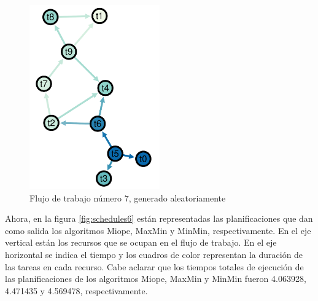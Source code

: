 \begin{figure}
\begin{center}
  \includegraphics[width=0.5\textwidth]{imagenes/workflow6.pdf}
\end{center}
\label{fig:workflow6}
\caption{Flujo de trabajo número 7, generado aleatoriamente}
\end{figure}

Ahora, en la figura \ref{fig:schedules6} están representadas las planificaciones que dan como salida los algoritmos Miope, MaxMin y MinMin, respectivamente. En el eje vertical están los recursos que se ocupan en el flujo de trabajo. En el eje horizontal se indica el tiempo y los cuadros de color representan la duración de las tareas en cada recurso. Cabe aclarar que los tiempos totales de ejecución de las planificaciones de los algoritmos Miope, MaxMin y MinMin fueron 4.063928, 4.471435 y 4.569478, respectivamente.

